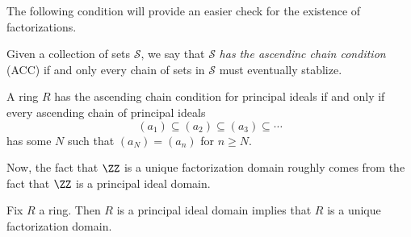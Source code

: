The following condition will provide an easier check for the existence of factorizations.
\begin{definition}
	Given a collection of sets $\mathcal S$, we say that $\mathcal S$ \textit{has the ascendinc chain condition} (ACC) if and only every chain of sets in $\mathcal S$ must eventually stablize.
\end{definition}
\begin{example}
	A ring $R$ has the ascending chain condition for principal ideals if and only if every ascending chain of principal ideals
	\[(a_1)\subseteq (a_2)\subseteq(a_3)\subseteq\cdots\]
	has some $N$ such that $(a_N)=(a_n)$ for $n\ge N$.
\end{example}
Now, the fact that $\ZZ$ is a unique factorization domain roughly comes from the fact that $\ZZ$ is a principal ideal domain.
\begin{theorem}
	Fix $R$ a ring. Then $R$ is a principal ideal domain implies that $R$ is a unique factorization domain.
\end{theorem}
